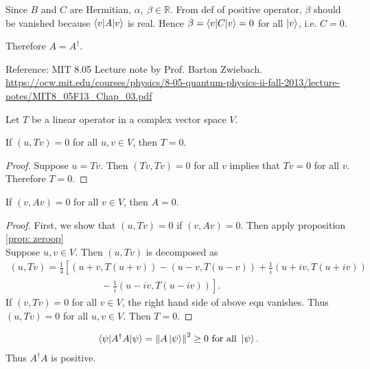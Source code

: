 Since $B$ and $C$ are Hermitian, $\alpha,~ \beta \in \mathds{R}$.
From def of positive operator, $\beta$ should be vanished because $\braket{v | A | v}$ is real.
Hence $\beta = \braket{v | C | v} =  0$ for all $\ket{v}$, i.e. $C = 0$.

Therefore $A = A^\dagger$.

\begin{screen}
	Reference: MIT 8.05 Lecture note  by Prof. Barton Zwiebach.\\
	\url{https://ocw.mit.edu/courses/physics/8-05-quantum-physics-ii-fall-2013/lecture-notes/MIT8_05F13_Chap_03.pdf}

	\begin{prop} \label{prop: zeroop}
		Let $T$ be a linear operator in a complex vector space $V$.

		If $(u, Tv) = 0$ for all $u, v \in V$, then $T = 0$.
	\end{prop}

	\begin{proof}
		Suppose $u = Tv$. Then $(Tv, Tv) = 0$ for all $v$ implies that $Tv = 0$ for all $v$. Therefore $T = 0$.
	\end{proof}

	\begin{thm}
		If $(v, Av) = 0$ for all $v \in V$, then $A = 0$. \label{thm:zerooperator}
	\end{thm}

	\begin{proof}
		First, we show that $(u, Tv) = 0$ if $(v, Av) = 0$. Then apply proposition \ref{prop: zeroop}\\
		Suppose $u, v \in V$. Then $(u, Tv)$ is decomposed as
		\begin{align*}
			(u, Tv) = \frac{1}{4} \left[ (u+v, T(u+v)) - (u-v, T(u-v)) + \frac{1}{i} (u+iv, T(u+iv)) \right.\\
			\left. \hspace{4cm} - \frac{1}{i} (u-iv, T(u-iv))  \right].
		\end{align*}
		If $(v, Tv) = 0$ for all $v \in V$, the right hand side of above eqn vanishes. Thus $(u, Tv) = 0$ for all $u, v \in V$.
		Then $T = 0$.
	\end{proof}


\end{screen}


\begin{align*}
	\braket{\psi | A^\dagger A | \psi} = \left\lVert A \ket{\psi}\right\rVert^2 \geq 0 \text{ for all } \ket{\psi}.
\end{align*}
Thus $A^\dagger A$ is positive.


